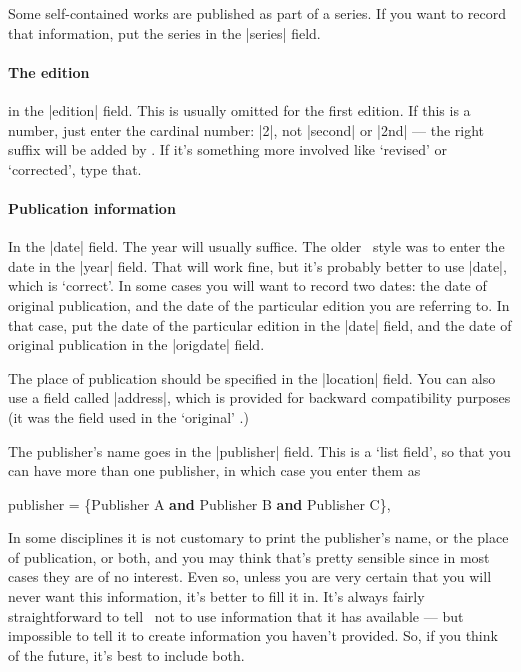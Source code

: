Some self-contained works are published as part of a series. If you
want to record that information, put the series in the |series| field.

\paragraph{The edition} in the |edition| field. This is usually
omitted for the first edition. If this is a number, just enter the
cardinal number: |{2}|, not |second| or |2nd| --- the right suffix
will be added by \biblatex. If it's something more involved like
`revised' or `corrected', type that.

\paragraph{Publication information} 

In the |date| field. The year will usually suffice. The older \bibtex\
style was to enter the date in the |year| field. That will work fine,
but it's probably better to use |date|, which is `correct'. In some
cases you will want to record two dates: the date of original
publication, and the date of the particular edition you are referring
to. In that case, put the date of the particular edition in the |date|
field, and the date of original publication in the |origdate| field.

The place of publication should be specified in the |location|
field. You can also use a field called |address|, which is provided
for backward compatibility purposes (it was the field used in the
`original' \bibtex.)

The publisher's name goes in the |publisher| field. This is a `list
field', so that you can have more than one publisher, in which case
you enter them as
\begin{center}
\ttfamily
publisher = \{Publisher A \textbf{and} Publisher B \textbf{and} Publisher C\},
\end{center}

In some disciplines it is not customary to print the publisher's name,
or the place of publication, or both, and you may think that's pretty
sensible since in most cases they are of no interest. Even so, unless
you are very certain that you will never want this information, it's
better to fill it in. It's always fairly straightforward to tell
\biblatex\ not to use information that it has available --- but
impossible to tell it to create information you haven't provided. So,
if you think of the future, it's best to include both.

